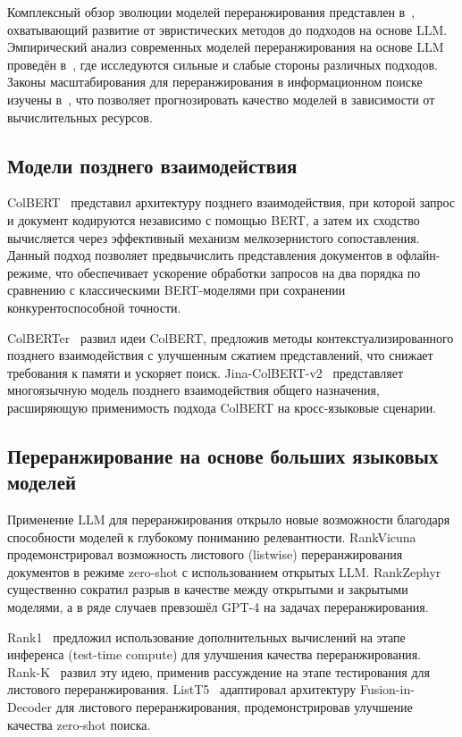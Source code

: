 Комплексный обзор эволюции моделей переранжирования представлен в~\cite{2512.16236}, охватывающий развитие от эвристических методов до подходов на основе LLM. Эмпирический анализ современных моделей переранжирования на основе LLM проведён в~\cite{2508.16757}, где исследуются сильные и слабые стороны различных подходов. Законы масштабирования для переранжирования в информационном поиске изучены в~\cite{2603.04816}, что позволяет прогнозировать качество моделей в зависимости от вычислительных ресурсов.

\subsection{Модели позднего взаимодействия}\label{subsec:late_interaction}

ColBERT~\cite{2004.12832} представил архитектуру позднего взаимодействия, при которой запрос и документ кодируются независимо с помощью BERT, а затем их сходство вычисляется через эффективный механизм мелкозернистого сопоставления. Данный подход позволяет предвычислить представления документов в офлайн-режиме, что обеспечивает ускорение обработки запросов на два порядка по сравнению с классическими BERT-моделями при сохранении конкурентоспособной точности.

ColBERTer~\cite{2203.13088} развил идеи ColBERT, предложив методы контекстуализированного позднего взаимодействия с улучшенным сжатием представлений, что снижает требования к памяти и ускоряет поиск. Jina-ColBERT-v2~\cite{2408.16672} представляет многоязычную модель позднего взаимодействия общего назначения, расширяющую применимость подхода ColBERT на кросс-языковые сценарии.

\subsection{Переранжирование на основе больших языковых моделей}\label{subsec:llm_reranking}

Применение LLM для переранжирования открыло новые возможности благодаря способности моделей к глубокому пониманию релевантности. RankVicuna~\cite{2309.15088} продемонстрировал возможность листового (listwise) переранжирования документов в режиме zero-shot с использованием открытых LLM. RankZephyr~\cite{2312.02724} существенно сократил разрыв в качестве между открытыми и закрытыми моделями, а в ряде случаев превзошёл GPT-4 на задачах переранжирования.

Rank1~\cite{2502.18418} предложил использование дополнительных вычислений на этапе инференса (test-time compute) для улучшения качества переранжирования. Rank-K~\cite{2505.14432} развил эту идею, применив рассуждение на этапе тестирования для листового переранжирования. ListT5~\cite{2402.15838} адаптировал архитектуру Fusion-in-Decoder для листового переранжирования, продемонстрировав улучшение качества zero-shot поиска.

